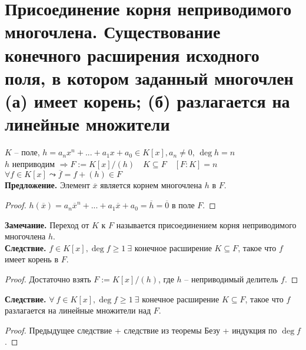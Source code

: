 \section{Присоединение корня неприводимого многочлена. Существование конечного расширения исходного поля, в котором заданный многочлен (а) имеет корень; (б) разлагается на линейные множители}

$K$ -- поле, $h=a_nx^n+...+a_1x+a_0\in K[x], a_n\neq 0$, $\deg{h}=n$\\
$h$ неприводим $\Rightarrow F:=K[x]/(h)\quad K\subseteq F\quad [F:K]=n$\\
$\forall f\in K[x]\leadsto \overline{f}=f+(h)\in F$\\
\textbf{Предложение.} Элемент $\overline{x}$ является корнем многочлена $h$ в $F$.
\begin{proof}
    $h(\overline{x})=a_n\overline{x}^n+...+a_1\overline{x}+a_0=\overline{h}=\overline{0}$ в поле $F$.
\end{proof}
\noindent \textbf{Замечание.} Переход от $K$ к $F$ называется присоединением корня неприводимого многочлена $h$.\\
\textbf{Следствие.} $f\in K[x], \deg{f}\geqslant 1 \ \exists $ конечное расширение $K\subseteq F$, такое что $f$ имеет корень в $F$.
\begin{proof}
    Достаточно взять $F:=K[x]/(h)$, где $h$ -- неприводимый делитель $f$.
\end{proof}
\noindent\textbf{Следствие.} $\forall \ f\in K[x], \deg{f}\geqslant 1\ \exists$ конечное расширение $K\subseteq F$, такое что $f$ разлагается на линейные множители над $F$.
\begin{proof}
    Предыдущее следствие + следствие из теоремы Безу + индукция по $\deg{f}$.
\end{proof}